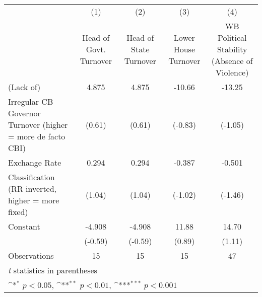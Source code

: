 {
\def\sym#1{\ifmmode^{#1}\else\(^{#1}\)\fi}
\begin{tabular}{l*{4}{c}}
\toprule
                &\multicolumn{1}{c}{(1)}&\multicolumn{1}{c}{(2)}&\multicolumn{1}{c}{(3)}&\multicolumn{1}{c}{(4)}\\
                &\multicolumn{1}{c}{Head of Govt. Turnover}&\multicolumn{1}{c}{Head of State Turnover}&\multicolumn{1}{c}{Lower House Turnover}&\multicolumn{1}{c}{WB Political Stability (Absence of Violence)}\\
\midrule
(Lack of)       &    4.875         &    4.875         &   -10.66         &   -13.25         \\
Irregular CB Governor Turnover (higher = more de facto CBI)&   (0.61)         &   (0.61)         &  (-0.83)         &  (-1.05)         \\
\addlinespace
Exchange Rate   &    0.294         &    0.294         &   -0.387         &   -0.501         \\
Classification (RR inverted, higher = more fixed)&   (1.04)         &   (1.04)         &  (-1.02)         &  (-1.46)         \\
\addlinespace
Constant        &   -4.908         &   -4.908         &    11.88         &    14.70         \\
                &  (-0.59)         &  (-0.59)         &   (0.89)         &   (1.11)         \\
\midrule
Observations    &       15         &       15         &       15         &       47         \\
\bottomrule
\multicolumn{5}{l}{\footnotesize \textit{t} statistics in parentheses}\\
\multicolumn{5}{l}{\footnotesize \sym{*} \(p<0.05\), \sym{**} \(p<0.01\), \sym{***} \(p<0.001\)}\\
\end{tabular}
}
